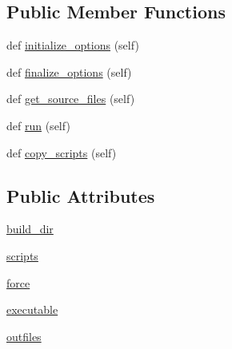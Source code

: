 \subsection*{Public Member Functions}
\begin{DoxyCompactItemize}
\item 
def \hyperlink{classsetuptools_1_1__distutils_1_1command_1_1build__scripts_1_1build__scripts_a1e0b311ea1ca78e7627ccf3c4616f710}{initialize\+\_\+options} (self)
\item 
def \hyperlink{classsetuptools_1_1__distutils_1_1command_1_1build__scripts_1_1build__scripts_a95103ec2fe75225d0afcba03aa8ccf04}{finalize\+\_\+options} (self)
\item 
def \hyperlink{classsetuptools_1_1__distutils_1_1command_1_1build__scripts_1_1build__scripts_a088e684c0035c26de371d9a79f73e3bc}{get\+\_\+source\+\_\+files} (self)
\item 
def \hyperlink{classsetuptools_1_1__distutils_1_1command_1_1build__scripts_1_1build__scripts_ae4b3bc4a2e0dd39d298dab878bffa3cf}{run} (self)
\item 
def \hyperlink{classsetuptools_1_1__distutils_1_1command_1_1build__scripts_1_1build__scripts_abce1fbb50d4fa5a832f4241f5a452482}{copy\+\_\+scripts} (self)
\end{DoxyCompactItemize}
\subsection*{Public Attributes}
\begin{DoxyCompactItemize}
\item 
\hyperlink{classsetuptools_1_1__distutils_1_1command_1_1build__scripts_1_1build__scripts_a87ca57ba67a1d1a416c52e65712974c7}{build\+\_\+dir}
\item 
\hyperlink{classsetuptools_1_1__distutils_1_1command_1_1build__scripts_1_1build__scripts_a16c2f09c7948005c041642a4b44ac1e6}{scripts}
\item 
\hyperlink{classsetuptools_1_1__distutils_1_1command_1_1build__scripts_1_1build__scripts_a07c86038d70d442730e486f49428e5de}{force}
\item 
\hyperlink{classsetuptools_1_1__distutils_1_1command_1_1build__scripts_1_1build__scripts_a39391853aedeaec9f08f086d4da82494}{executable}
\item 
\hyperlink{classsetuptools_1_1__distutils_1_1command_1_1build__scripts_1_1build__scripts_afb2b9d8a0548408968f5a895403d4204}{outfiles}
\end{DoxyCompactItemize}
